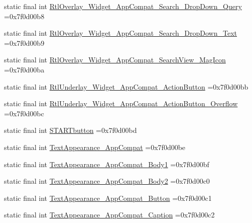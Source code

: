 \begin{DoxyCompactItemize}
\item 
static final int \mbox{\hyperlink{classcom_1_1example_1_1trainawearapplication_1_1_r_1_1style_a404f1efbc1a142570decb3836f892686}{Rtl\+Overlay\+\_\+\+Widget\+\_\+\+App\+Compat\+\_\+\+Search\+\_\+\+Drop\+Down\+\_\+\+Query}} =0x7f0d00b8
\item 
static final int \mbox{\hyperlink{classcom_1_1example_1_1trainawearapplication_1_1_r_1_1style_a2e778a50c1da7ed69d37aec08b9d391e}{Rtl\+Overlay\+\_\+\+Widget\+\_\+\+App\+Compat\+\_\+\+Search\+\_\+\+Drop\+Down\+\_\+\+Text}} =0x7f0d00b9
\item 
static final int \mbox{\hyperlink{classcom_1_1example_1_1trainawearapplication_1_1_r_1_1style_a68f308a7db93d8cc5ad9950b5d86c184}{Rtl\+Overlay\+\_\+\+Widget\+\_\+\+App\+Compat\+\_\+\+Search\+View\+\_\+\+Mag\+Icon}} =0x7f0d00ba
\item 
static final int \mbox{\hyperlink{classcom_1_1example_1_1trainawearapplication_1_1_r_1_1style_a8e4fa08e3be95c594753c5457c00aa90}{Rtl\+Underlay\+\_\+\+Widget\+\_\+\+App\+Compat\+\_\+\+Action\+Button}} =0x7f0d00bb
\item 
static final int \mbox{\hyperlink{classcom_1_1example_1_1trainawearapplication_1_1_r_1_1style_af68327f4ac4de28cf9d738f4d81ccdc1}{Rtl\+Underlay\+\_\+\+Widget\+\_\+\+App\+Compat\+\_\+\+Action\+Button\+\_\+\+Overflow}} =0x7f0d00bc
\item 
static final int \mbox{\hyperlink{classcom_1_1example_1_1trainawearapplication_1_1_r_1_1style_aabdd69d6238ec131f2a76c1478a3fb6a}{S\+T\+A\+R\+Tbutton}} =0x7f0d00bd
\item 
static final int \mbox{\hyperlink{classcom_1_1example_1_1trainawearapplication_1_1_r_1_1style_af8f8352da1d8489b998e34ee22296102}{Text\+Appearance\+\_\+\+App\+Compat}} =0x7f0d00be
\item 
static final int \mbox{\hyperlink{classcom_1_1example_1_1trainawearapplication_1_1_r_1_1style_a6e418a6dc011f22e4d83475c1aaed91f}{Text\+Appearance\+\_\+\+App\+Compat\+\_\+\+Body1}} =0x7f0d00bf
\item 
static final int \mbox{\hyperlink{classcom_1_1example_1_1trainawearapplication_1_1_r_1_1style_afe78dfba7536f490b46949a2ae88bc85}{Text\+Appearance\+\_\+\+App\+Compat\+\_\+\+Body2}} =0x7f0d00c0
\item 
static final int \mbox{\hyperlink{classcom_1_1example_1_1trainawearapplication_1_1_r_1_1style_a34dd9ab9dd662567aff4ad93a4e6353a}{Text\+Appearance\+\_\+\+App\+Compat\+\_\+\+Button}} =0x7f0d00c1
\item 
static final int \mbox{\hyperlink{classcom_1_1example_1_1trainawearapplication_1_1_r_1_1style_a3102a5c7b41463cca31a0f77a4d1f94a}{Text\+Appearance\+\_\+\+App\+Compat\+\_\+\+Caption}} =0x7f0d00c2

\end{DoxyCompactItemize}
